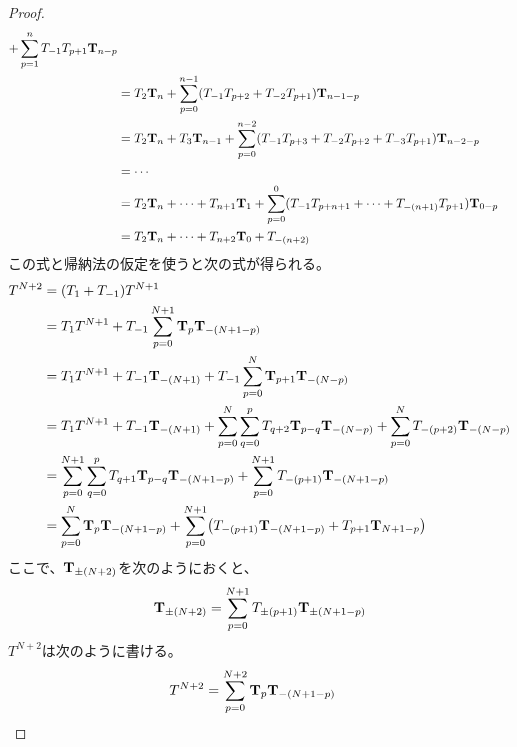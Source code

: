 {\begin{proof}
\begin{equation*}
\begin{split}
				+ \sum_{p=1}^n T_{-1}T_{p+1}{\mathbf{T}}_{n-p} \\
			&= T_2{\mathbf{T}}_{n} + \sum_{p=0}^{n-1}
				(T_{-1}T_{p+2} + T_{-2}T_{p+1}){\mathbf{T}}_{n-1-p} \\
			&= T_2{\mathbf{T}}_{n} + T_3{\mathbf{T}}_{n-1} + \sum_{p=0}^{n-2}
				(T_{-1}T_{p+3} + T_{-2}T_{p+2} + T_{-3}T_{p+1}) {\mathbf{T}}_{n-2-p} \\
			&= \cdots \\
			&= T_2{\mathbf{T}}_{n} +\cdots+ T_{n+1}{\mathbf{T}}_{1} + \sum_{p=0}^{0}
				(T_{-1}T_{p+n+1} +\cdots+ T_{-(n+1)}T_{p+1}){\mathbf{T}}_{0-p} \\
			&= T_2{\mathbf{T}}_{n} +\cdots+ T_{n+2}{\mathbf{T}}_{0} + T_{-(n+2)} \\
		\end{split}\end{equation*}
		この式と帰納法の仮定を使うと次の式が得られる。
		\begin{equation*}\begin{split}
			T^{N+2} &= (T_1 + T_{-1})T^{N+1} \\
			&= T_1T^{N+1} 
				+ T_{-1}\sum_{p=0}^{N+1} {\mathbf{T}}_p{\mathbf{T}}_{-(N+1-p)} \\
			&= T_1T^{N+1} + T_{-1}{\mathbf{T}}_{-(N+1)}
				+ T_{-1}\sum_{p=0}^{N} {\mathbf{T}}_{p+1}{\mathbf{T}}_{-(N-p)} \\
			&= T_1T^{N+1} + T_{-1}{\mathbf{T}}_{-(N+1)}
				+ \sum_{p=0}^{N}\sum_{q=0}^p T_{q+2}{\mathbf{T}}_{p-q}{\mathbf{T}}_{-(N-p)}
				+ \sum_{p=0}^{N}T_{-(p+2)}{\mathbf{T}}_{-(N-p)} \\
			&= \sum_{p=0}^{N+1}\sum_{q=0}^{p} 
				T_{q+1}{\mathbf{T}}_{p-q}{\mathbf{T}}_{-(N+1-p)}
				+ \sum_{p=0}^{N+1}T_{-(p+1)}{\mathbf{T}}_{-(N+1-p)} \\
			&= \sum_{p=0}^{N} {\mathbf{T}}_{p}{\mathbf{T}}_{-(N+1-p)}
				+ \sum_{p=0}^{N+1} \bigl(T_{-(p+1)}{\mathbf{T}}_{-(N+1-p)} 
				+ T_{p+1}{\mathbf{T}}_{N+1-p}\bigr) \\
		\end{split}\end{equation*}
		ここで、${\mathbf{T}}_{\pm(N+2)}$を次のようにおくと、
		\begin{equation*}\begin{split}
			{\ensuremath{\mathbf{T}}}_{\pm(N+2)} 
			= \sum_{p=0}^{N+1} T_{\pm(p+1)}{\mathbf{T}}_{\pm(N+1-p)} 
		\end{split}\end{equation*}
		$T^{N+2}$は次のように書ける。
		\begin{equation*}\begin{split}
			T^{N+2} &= \sum_{p=0}^{N+2} {\mathbf{T}}_{p}{\mathbf{T}}_{-(N+1-p)}
		\end{split}\end{equation*}

\end{proof}}
